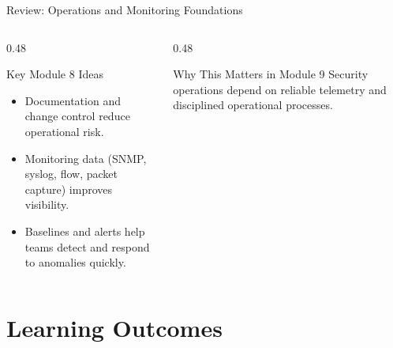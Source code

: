 \documentclass[aspectratio=169]{beamer}  %
\begin{document}
\begin{frame}{Review: Operations and Monitoring Foundations}
    \begin{columns}[T]
        \begin{column}{0.48\textwidth}
            \begin{block}{Key Module 8 Ideas}
                \begin{itemize}
                    \item Documentation and change control reduce operational risk.
                    \item Monitoring data (SNMP, syslog, flow, packet capture) improves visibility.
                    \item Baselines and alerts help teams detect and respond to anomalies quickly.
                \end{itemize}
            \end{block}
        \end{column}
        \begin{column}{0.48\textwidth}
            \begin{alertblock}{Why This Matters in Module 9}
                Security operations depend on reliable telemetry and disciplined operational processes.
            \end{alertblock}
        \end{column}
    \end{columns}
\end{frame}

\section*{Learning Outcomes}
\end{document}
